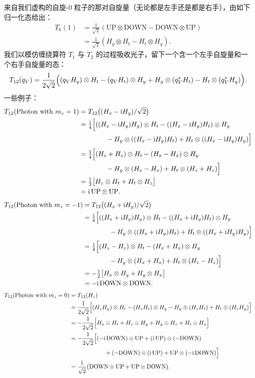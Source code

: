 来自我们虚构的自旋-0 粒子的那对自旋量（无论都是左手还是都是右手），由如下归一化态给出：
\begin{align*}
T_6(1)
&= \frac{1}{\sqrt2}(\text{UP}\otimes\text{DOWN}-\text{DOWN}\otimes\text{UP})\\
&= \frac{1}{\sqrt2}(H_y\otimes H_t-H_t\otimes H_y).
\end{align*}
我们以模仿缠绕算符 $T_1$ 与 $T_2$ 的过程吸收光子，留下一个含一个左手自旋量和一个右手自旋量的态：
\begin{equation*}
T_{12}(q_V)=\frac{1}{2\sqrt2}\Bigl((q_V H_y)\otimes H_t-(q_V H_t)\otimes H_y
+H_y\otimes(q_V^* H_t)-H_t\otimes(q_V^* H_y)\Bigr).
\end{equation*}
一些例子：
\begin{align*}
T_{12}(\text{Photon with }m_z=1)
&= T_{12}\bigl((H_x-\mathrm{i} H_y)/\sqrt2\bigr)\\
&= \tfrac14\Bigl[((H_x-\mathrm{i} H_y)H_y)\otimes H_t-((H_x-\mathrm{i} H_y)H_t)\otimes H_y\\
&\qquad\qquad -H_y\otimes((H_x-\mathrm{i} H_y)H_t)+H_t\otimes((H_x-\mathrm{i} H_y)H_y)\Bigr]\\
&= \tfrac14\Bigl[(H_z+H_z)\otimes H_t-(H_x-H_x)\otimes H_y\\
&\qquad\qquad -H_y\otimes(H_x-H_x)+H_t\otimes(H_z+H_z)\Bigr]\\
&= \tfrac12\bigl[H_z\otimes H_t+H_t\otimes H_z\bigr]\\
&= \mathrm{i}\,\text{UP}\otimes\text{UP}.
\end{align*}
\begin{align*}
T_{12}(\text{Photon with }m_z=-1)
&= T_{12}\bigl((H_x+\mathrm{i} H_y)/\sqrt2\bigr)\\
&= \tfrac14\Bigl[((H_x+\mathrm{i} H_y)H_y)\otimes H_t-((H_x+\mathrm{i} H_y)H_t)\otimes H_y\\
&\qquad\qquad -H_y\otimes((H_x+\mathrm{i} H_y)H_t)+H_t\otimes((H_x+\mathrm{i} H_y)H_y)\Bigr]\\
&= \tfrac14\Bigl[(H_z-H_z)\otimes H_t-(H_x+H_x)\otimes H_y\\
&\qquad\qquad -H_y\otimes(H_x+H_x)+H_t\otimes(H_z-H_z)\Bigr]\\
&= -\tfrac12\bigl[H_x\otimes H_y+H_y\otimes H_x\bigr]\\
&= -\mathrm{i}\,\text{DOWN}\otimes\text{DOWN}.
\end{align*}
\begin{align*}
T_{12}(\text{Photon with }m_z=0)
&= T_{12}(H_z)\\
&= \frac{1}{2\sqrt2}\Bigl[(H_z H_y)\otimes H_t-(H_z H_t)\otimes H_y
-H_y\otimes(H_z H_t)+H_t\otimes(H_z H_y)\Bigr]\\
&= -\frac{1}{2\sqrt2}\Bigl[H_x\otimes H_t+H_z\otimes H_y+H_y\otimes H_z+H_t\otimes H_x\Bigr]\\
&= -\frac{1}{2\sqrt2}\Bigl[(-\mathrm{i}\,\text{DOWN})\otimes\text{UP}+(\mathrm{i}\,\text{UP})\otimes(-\text{DOWN})\\
&\qquad\qquad\qquad +(-\text{DOWN})\otimes(\mathrm{i}\,\text{UP})+\text{UP}\otimes(-\mathrm{i}\,\text{DOWN})\Bigr]\\
&= \frac{\mathrm{i}}{\sqrt2}\bigl(\text{DOWN}\otimes\text{UP}+\text{UP}\otimes\text{DOWN}\bigr).
\end{align*}
